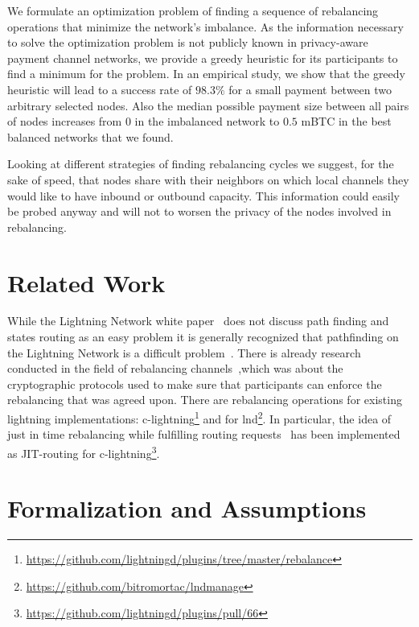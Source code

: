 \documentclass[conference]{IEEEtran}
\begin{document}
We formulate an optimization problem of finding a sequence of rebalancing operations that minimize the network's imbalance.
As the information necessary to solve the optimization problem is not publicly known in privacy-aware payment channel networks, we provide a greedy heuristic for its participants to find a minimum for the problem. 
In an empirical study, we show that the greedy heuristic will lead to a success rate of $98.3\%$ for a small payment between two arbitrary selected nodes.
Also the median possible payment size between all pairs of nodes increases from $0$ in the imbalanced network to $0.5$ mBTC in the best balanced networks that we found.

Looking at different strategies of finding rebalancing cycles we suggest, for the sake of speed, that nodes share with their neighbors on which local channels they would like to have inbound or outbound capacity.
This information could easily be probed anyway and will not to worsen the privacy of the nodes involved in rebalancing.

\section{Related Work}
\label{sec:relatedWork}

While the Lightning Network white paper~\cite{poon2016bitcoin} does not discuss path finding and states routing as an easy problem it is generally recognized that pathfinding on the Lightning Network is a difficult problem~\cite{piatkivskyi2018split, prihodko2016flare, bagaria2019boomerang, pickhardt2019pathfinding, grunspan2018ant, sivaraman2018routing}.
There is already research conducted in the field of rebalancing channels~\cite{khalil2017revive},which was about the cryptographic protocols used to make sure that participants can enforce the rebalancing that was agreed upon.
There are rebalancing operations for existing lightning implementations: c-lightning\footnote{\url{https://github.com/lightningd/plugins/tree/master/rebalance}} and for lnd\footnote{\url{https://github.com/bitromortac/lndmanage}}.
In particular, the idea of just in time rebalancing while fulfilling routing requests~\cite{pickhardt2019jit} has been implemented as JIT-routing for c-lightning\footnote{\url{https://github.com/lightningd/plugins/pull/66}}. 

\section{Formalization and Assumptions}
\label{sec:formalization}
\end{document}
